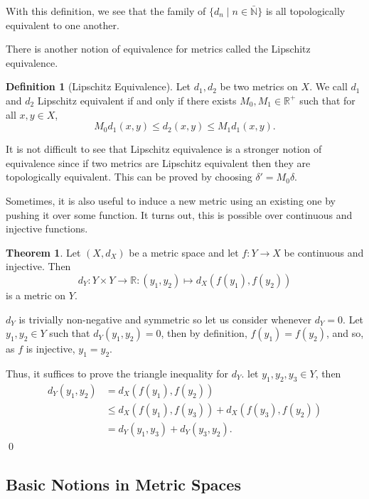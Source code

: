 \documentclass[
]{article}
\theoremstyle{definition}
\newtheorem{theorem}{Theorem}
\theoremstyle{definition}
\newtheorem{definition}{Definition}[section]
\begin{document}
With this definition, we see that the family of
\(\{d_n \mid n \in \bar{\mathbb{N}}\}\) is all topologically equivalent
to one another.

There is another notion of equivalence for metrics called the Lipschitz
equivalence.

\begin{definition}[Lipschitz Equivalence]
  Let \(d_1, d_2\) be two metrics on \(X\). We call \(d_1\) and \(d_2\) 
  Lipschitz equivalent if and only if there exists \(M_0, M_1 \in \mathbb{R}^+\) 
  such that for all \(x, y \in X\),
  \[M_0 d_1(x, y) \le d_2(x, y) \le M_1 d_1(x, y).\] 
\end{definition}

It is not difficult to see that Lipschitz equivalence is a stronger
notion of equivalence since if two metrics are Lipschitz equivalent then
they are topologically equivalent. This can be proved by choosing
\(\delta' = M_0\delta\).

Sometimes, it is also useful to induce a new metric using an existing
one by pushing it over some function. It turns out, this is possible
over continuous and injective functions.

\begin{theorem}\label{induce_metric}
  Let \((X, d_X)\) be a metric space and let \(f : Y \to X\) be continuous and 
  injective. Then 
  \[d_Y : Y \times Y \to \mathbb{R} : (y_1, y_2) \mapsto d_X(f(y_1), f(y_2))\]
  is a metric on \(Y\).
\end{theorem}
\proof

\(d_Y\) is trivially non-negative and symmetric so let us consider
whenever \(d_Y = 0\). Let \(y_1, y_2 \in Y\) such that
\(d_Y(y_1, y_2) = 0\), then by definition, \(f(y_1) = f(y_2)\), and so,
as \(f\) is injective, \(y_1 = y_2\).

Thus, it suffices to prove the triangle inequality for \(d_Y\). let
\(y_1, y_2, y_3 \in Y\), then \begin{align*}
    d_Y(y_1, y_2) & = d_X(f(y_1), f(y_2)) \\
      & \le d_X(f(y_1), f(y_3)) + d_X(f(y_3), f(y_2))\\
      & = d_Y(y_1, y_3) + d_Y(y_3, y_2).
  \end{align*} \qed

\hypertarget{basic-notions-in-metric-spaces}{%
\subsection{Basic Notions in Metric
Spaces}\label{basic-notions-in-metric-spaces}}
\end{document}
